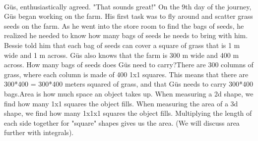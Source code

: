  \paragraph{} Güs, enthusiastically agreed. "That sounds great!"
{On the 9th day of the journey, Güs began working on the farm. His first task was to fly around and scatter grass seeds on the farm. As he went into the store room to find the bags of seeds, he realized he needed to know how many bags of seeds he needs to bring with him. Bessie told him that each bag of seeds can cover a square of grass that is 1 m wide and 1 m across. Güs also knows that the farm is 300 m wide and 400 m across. How many bags of seeds does Güs need to carry?}{There are 300 columns of grass, where each column is made of 400 1x1 squares. This means that there are 300*400 = 300*400 meters squared of grass, and that Güs needs to carry 300*400 bags.}{Area is how much space an object takes up. When measuring a 2d shape, we find how many 1x1 squares the object fills. When measuring the area of a 3d shape, we find how many 1x1x1 squares the object fills. Multiplying the length of each side together for "square" shapes gives us the area. (We will discuss area further with integrals).
}{}
